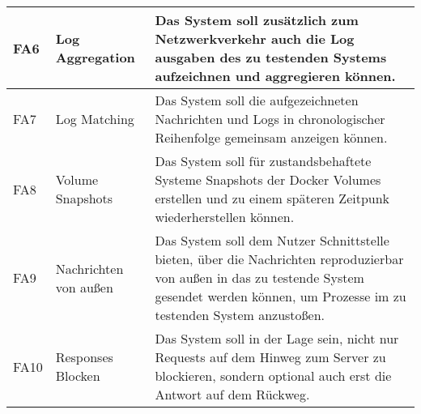 \documentclass[12pt,a4paper]{report}
\begin{document}
\begin{table}[h]
\begin{tabular}{|l|l|p{7cm}|}
		FA6  & Log Aggregation               & Das System soll zusätzlich zum Netzwerkverkehr auch die Log ausgaben des zu testenden Systems aufzeichnen und aggregieren können.                                                                                     \\ \hline
		FA7  & Log Matching                  & Das System soll die aufgezeichneten Nachrichten und Logs in chronologischer Reihenfolge gemeinsam anzeigen können.                                                                                                    \\ \hline
		FA8  & Volume Snapshots              & Das System soll für zustandsbehaftete Systeme Snapshots der Docker Volumes erstellen und zu einem späteren Zeitpunk wiederherstellen können.                                                                          \\ \hline
		FA9  & Nachrichten von außen         & Das System soll dem Nutzer Schnittstelle bieten, über die Nachrichten reproduzierbar von außen in das zu testende System gesendet werden können, um Prozesse im zu testenden System anzustoßen.                       \\ \hline
		FA10 & Responses Blocken             & Das System soll in der Lage sein, nicht nur Requests auf dem Hinweg zum Server zu blockieren, sondern optional auch erst die Antwort auf dem Rückweg.                                                                 \\ \hline
	\end{tabular}
\end{table}
\end{document}
